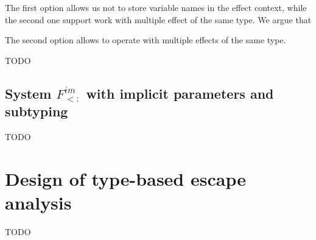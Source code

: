 \documentclass[acmsmall]{acmart}
\begin{document}
The first option allows us not to store variable names in the effect context, while the second one support work with multiple effect of the same type.
We argue that


The second option allows to operate with multiple effects of the same type.



TODO %





\subsection{System $F^{im}_{<:}$ with implicit parameters and subtyping} \label{subsec:im-sub}


TODO %


\section{Design of type-based escape analysis} \label{sec:escape}



TODO %



%


\end{document}
